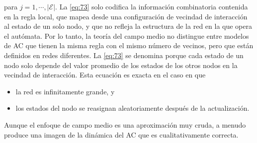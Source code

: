 para $j=1,\cdots,\left|\mathcal{E} \right|$.   La \cref{eq:73} solo codifica la información combinatoria contenida en la regla local, que mapea desde una configuración de vecindad de interacción al estado de un solo nodo, y que no refleja la estructura de la red en la que opera el autómata. Por lo tanto, la teoría del campo medio no distingue entre modelos de AC que tienen la misma regla con el mismo número de vecinos, pero que están definidos en redes diferentes. La \cref{eq:73}  se denomina  porque cada estado de un nodo solo depende del valor promedio de los estados de los otros nodos en la vecindad de interacción. Esta ecuación es exacta en el caso en que

\begin{itemize}
	\item la red es infinitamente grande, y
	\item los estados del nodo se reasignan aleatoriamente después de la actualización.
\end{itemize}

Aunque el enfoque de campo medio es una aproximación muy cruda, a menudo produce una imagen de la dinámica del AC que es cualitativamente correcta.
